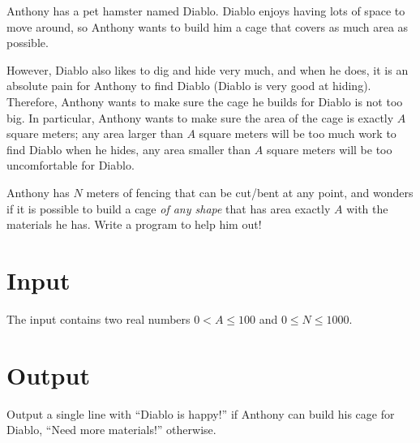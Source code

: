 
Anthony has a pet hamster named Diablo. Diablo enjoys having lots of space to move around, so Anthony wants to build him a cage that covers as much area as possible.

However, Diablo also likes to dig and hide very much, and when he does, it is an absolute pain for Anthony to find Diablo (Diablo is very good at hiding). Therefore, Anthony wants to make sure the cage he builds for Diablo is not too big. In particular, Anthony wants to make sure the area of the cage is exactly $A$ square meters; any area larger than $A$ square meters will be too much work to find Diablo when he hides, any area smaller than $A$ square meters will be too uncomfortable for Diablo.

Anthony has $N$ meters of fencing that can be cut/bent at any point, and wonders if it is possible to build a cage \emph{of any shape} that has area exactly $A$ with the materials he has. Write a program to help him out!

\section*{Input}

The input contains two real numbers $0<A\leq 100$ and $0\leq N\leq 1000$.

\section*{Output}

Output a single line with ``Diablo is happy!'' if Anthony can build his cage for Diablo, ``Need more materials!'' otherwise.

